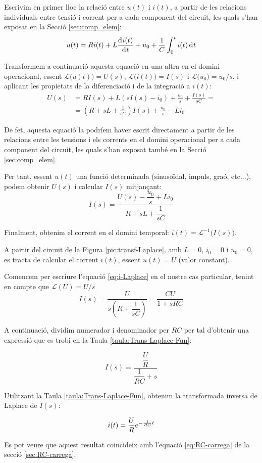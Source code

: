 Escrivim en primer lloc  la relació entre $u(t)$ i $i(t)$, a partir
de les relacions individuals entre tensió i corrent per a cada
component del circuit, les quals s'han exposat en la Secció
\vref{sec:comp_elem}:
\begin{equation}
    u(t) = R i(t) + L \frac{\diff i(t)}{\diff t} + u_0 + \frac{1}{C}
    \int_0^t i(t) \diff t
\end{equation}

Transformem a continuació aquesta equació en una altra en el domini
operacional, essent $\mathcal{L}\bigl(u(t)\bigr) = U(s)$,
$\mathcal{L}\bigl(i(t)\bigr) = I(s)$ i $\mathcal{L}\bigl(u_0\bigr) =
u_0/s$, i aplicant les propietats de la diferenciació i de la
integració a $i(t)$:
\begin{equation}\begin{split}
    U(s) &= R I(s) + L(s I(s) -i_0) + \frac{u_0}{s} + \frac{I(s)}{s
    C} =\\[1ex]
    &= \left( R + s L +\frac{1}{s C}\right)I(s) + \frac{u_0}{s} - L i_0
\end{split}\end{equation}

De fet, aquesta equació la podríem haver escrit directament a
partir de les relacions entre les tensions i els corrents en el
domini operacional per a cada  component del circuit, les quals
s'han exposat també en la Secció \vref{sec:comp_elem}.

Per tant, essent $u(t)$  una funció determinada (sinusoïdal, impuls,
graó, etc...), podem obtenir $U(s)$ i calcular $I(s)$ mitjançant:
\begin{equation}
    I(s) = \frac{U(s)-\dfrac{u_0}{s} + L i_0}{R + s L
    +\dfrac{1}{s C}}\label{eq:i-Laplace}
\end{equation}

Finalment, obtenim el corrent en el domini temporal: $i(t) =
\mathcal{L}^{-1}\bigl(I(s)\bigr)$.

\begin{exemple}
    A partir del circuit de la Figura \vref{pic:transf-Laplace}, amb
    $L=0$, $i_0=0$ i $u_0=0$, es tracta de calcular el corrent $i(t)$,
    essent $u(t)=U$ (valor constant).

    Comencem per escriure l'equació \eqref{eq:i-Laplace} en el nostre
    cas particular, tenint en compte que $\mathcal{L}(U) = U/s$
    \[
        I(s) = \frac{U}{s\left(R + \dfrac{1}{s C}\right)} = \frac{C U}{1 + s R C}
    \]

    A continuació, dividim numerador i denominador per $R C$ per tal
    d'obtenir una expressió que es trobi en la Taula
    \vref{taula:Trans-Laplace-Fun}:

    \[
        I(s) = \frac{\dfrac{U}{R}}{\dfrac{1}{R C} + s}
    \]

    Utilitzant la Taula \vref{taula:Trans-Laplace-Fun}, obtenim la transformada inversa de Laplace de $I(s)$:

    \[
        i(t) = \frac{U}{R} \mathrm{e}^{-\frac{1}{R C}t}
    \]

    Es pot veure que aquest resultat coincideix amb l'equació \eqref{eq:RC-carrega} de la secció \vref{sec:RC-carrega}.
\end{exemple}

